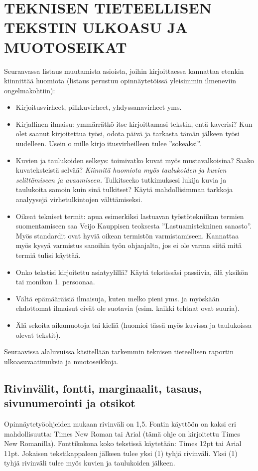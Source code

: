 \documentclass{LUT_pohja}[2016/03/09 LUT Dippa Pohja]
\begin{document}
\newpage
\section{TEKNISEN TIETEELLISEN TEKSTIN ULKOASU JA MUOTOSEIKAT}

Seuraavassa listaus muutamista asioista, joihin kirjoittaessa kannattaa etenkin kiinnittää huomiota (listaus perustuu opinnäytetöissä yleisimmin ilmeneviin ongelmakohtiin): 
\begin{itemize}
\item Kirjoitusvirheet, pilkkuvirheet, yhdyssanavirheet yms.
\item Kirjallinen ilmaisu: ymmärrätkö itse kirjoittamasi tekstin, entä kaverisi? Kun olet saanut kirjoitettua työsi, odota päivä ja tarkasta tämän jälkeen työsi uudelleen. Usein o mille kirjo itusvirheilleen tulee ”sokeaksi”. 
\item Kuvien ja taulukoiden selkeys: toimivatko kuvat myös mustavalkoisina? Saako 
kuvateksteistä selvää? \textit{Kiinnitä huomiota myös taulukoiden ja kuvien selittämiseen 
ja avaamiseen.} Tulkitseeko tutkimuksesi lukija kuvia ja taulukoita samoin kuin sinä 
tulkitset?  Käytä  mahdollisimman  tarkkoja  analyysejä  virhetulkintojen 
välttämiseksi.
\item Oikeat  tekniset  termit: apua esimerkiksi  lastuavan työstötekniikan termien 
suomentamiseen  saa Veijo  Kauppisen \citeyearpar{Kauppinen90} teoksesta ”Lastuamistekninen sanasto”. Myös standardit ovat hyviä oikean termistön varmistamiseen. Kannattaa myös kysyä varmistus sanoihin työn ohjaajalta, jos ei ole varma siitä mitä termiä tulisi käyttää.
\item Onko tekstisi kirjoitettu asiatyylillä? Käytä tekstissäsi passiivia, älä yksikön tai monikon 1. persoonaa. 
\item Vältä epämääräisiä ilmaisuja, kuten melko pieni yms. ja myöskään ehdottomat 
ilmaisut eivät ole suotavia (esim. kaikki tehtaat ovat suuria).
\item Älä sekoita aikamuotoja tai kieliä (huomioi tässä myös kuvissa ja taulukoissa 
olevat tekstit).
\end{itemize}
Seuraavissa  alaluvuissa  käsitellään  tarkemmin  teknisen  tieteellisen  raportin 
ulkoasuvaatimuksia ja muotoseikkoja.
\subsection{Rivinvälit, fontti, marginaalit, tasaus, sivunumerointi ja otsikot}
Opinnäytetyöohjeiden mukaan rivinväli on 1,5.  Fontin käyttöön on kaksi eri 
mahdollisuutta: Times New Roman tai Arial (tämä ohje on kirjoitettu Times New 
Romanilla). Fonttikokona koko tekstissä käytetään: Times 12pt tai Arial 11pt.  Jokaisen tekstikappaleen jälkeen tulee yksi (1) tyhjä rivinväli. Yksi (1) tyhjä rivinväli tulee myös kuvien ja taulukoiden jälkeen.
\end{document}
